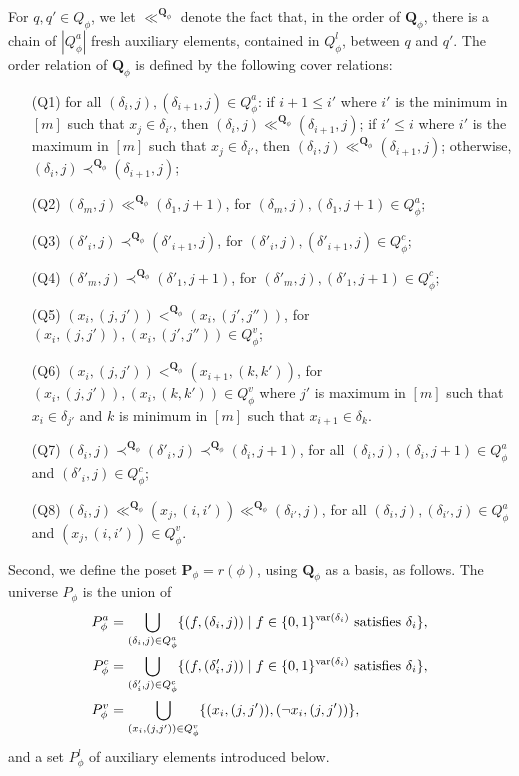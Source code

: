 \documentclass[usletter]{article}
\newcommand{\pp}{\mathbf{P}}
\newcommand{\qq}{\mathbf{Q}}
\begin{document}
For $q,q' \in Q_{\phi}$, we let $\ll^{\qq_{\phi}}$ 
denote the fact that, in the order of $\qq_{\phi}$, 
there is a chain of $|Q^a_{\phi}|$ fresh auxiliary elements, contained in $Q^l_{\phi}$, between $q$ and $q'$.  
The order relation of $\qq_{\phi}$ is defined by the following cover relations:
\begin{itemize}
\item[(Q1)] for all $(\delta_i,j),(\delta_{i+1},{j}) \in Q_{\phi}^a$:  
if $i+1 \leq i'$ where $i'$ is the minimum in $[m]$ such that $x_j \in \delta_{i'}$, 
then $(\delta_i,j) \ll^{\qq_{\phi}} (\delta_{i+1},{j})$;  
if $i' \leq i$ where $i'$ is the maximum in $[m]$ such that $x_j \in \delta_{i'}$, 
then $(\delta_i,j) \ll^{\qq_{\phi}} (\delta_{i+1},{j})$;  
otherwise, $(\delta_i,j) \prec^{\qq_{\phi}} (\delta_{i+1},{j})$;
\item[(Q2)] $(\delta_m,j) \ll^{\qq_{\phi}} (\delta_{1},{j+1})$, for $(\delta_m,j),(\delta_{1},{j+1}) \in Q_{\phi}^a$; 
\item[(Q3)] $(\delta'_i,j) \prec^{\qq_{\phi}} (\delta'_{i+1},{j})$, for $(\delta'_i,j),(\delta'_{i+1},{j}) \in Q_{\phi}^c$; 
\item[(Q4)] $(\delta'_m,j) \prec^{\qq_{\phi}} (\delta'_{1},{j+1})$, for $(\delta'_m,j),(\delta'_{1},{j+1}) \in Q_{\phi}^c$; 
\item[(Q5)] $(x_i,(j,j')) <^{\qq_{\phi}} (x_i,(j',j''))$, 
for $(x_i,(j,j')),(x_i,(j',j'')) \in Q_{\phi}^v$; 
\item[(Q6)] $(x_i,(j,j')) <^{\qq_{\phi}} (x_{i+1},(k,k'))$, 
for $(x_i,(j,j')),(x_i,(k,k')) \in Q_{\phi}^v$ where 
$j'$ is maximum in $[m]$ such that $x_i \in \delta_{j'}$ 
and $k$ is minimum in $[m]$ such that $x_{i+1} \in \delta_{k}$.
\item[(Q7)] $(\delta_i,j) \prec^{\qq_{\phi}} (\delta'_i,j) \prec^{\qq_{\phi}} (\delta_i,j+1)$, 
for all $(\delta_i,j),(\delta_i,j+1) \in Q_{\phi}^a$ and $(\delta'_i,j) \in Q_{\phi}^c$;
\item[(Q8)] $(\delta_i,j) \ll^{\qq_{\phi}} (x_j,(i,i')) \ll^{\qq_{\phi}} (\delta_{i'},j)$, 
for all $(\delta_i,j),(\delta_{i'},j) \in Q_{\phi}^a$ and $(x_j,(i,i')) \in Q_{\phi}^v$.
\end{itemize}

Second, we define the poset $\pp_{\phi}=r(\phi)$, 
using $\qq_{\phi}$ as a basis, as follows.  
The universe $P_{\phi}$ is the union of  
\begin{align*}
P_{\phi}^a &= \bigcup_{(\delta_i,j) \in Q_{\phi}^a} \{ (f,(\delta_i,j)) \mid f \in \{0,1\}^{\textup{var}(\delta_i)} \textup{ satisfies } \delta_i \}\text{,}\\ 
P_{\phi}^c &= \bigcup_{(\delta'_i,j) \in Q_{\phi}^c} \{ (f,(\delta'_i,j)) \mid f \in \{0,1\}^{\textup{var}(\delta_i)} \textup{ satisfies } \delta_i \}\text{,}\\
P_{\phi}^v &=\bigcup_{(x_i,(j,j')) \in Q_{\phi}^v} \{ (x_i,(j,j')), (\neg x_i,(j,j'))\}\text{,}
\end{align*}
and a set $P_{\phi}^l$ of auxiliary elements introduced below. 
\end{document}
